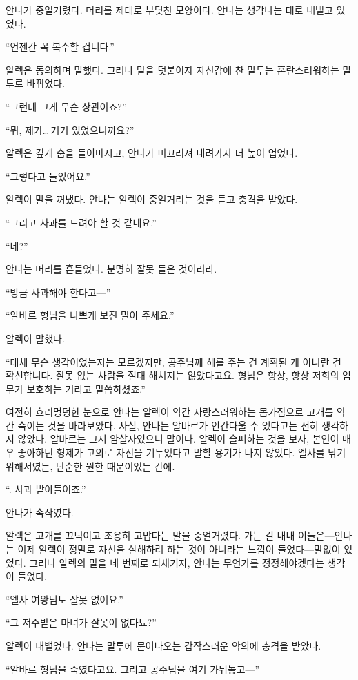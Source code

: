 안나가 중얼거렸다. 머리를 제대로 부딪친 모양이다. 안나는 생각나는 대로 내뱉고 있었다.

``언젠간 꼭 복수할 겁니다.''

알렉은 동의하며 말했다. 그러나 말을 덧붙이자 자신감에 찬 말투는 혼란스러워하는 말투로 바뀌었다.

``그런데 그게 무슨 상관이죠?''

``뭐, 제가\ldots\,거기 있었으니까요?''

알렉은 깊게 숨을 들이마시고, 안나가 미끄러져 내려가자 더 높이 업었다.

``그렇다고 들었어요.''

알렉이 말을 꺼냈다. 안나는 알렉이 중얼거리는 것을 듣고 충격을 받았다.

``그리고 사과를 드려야 할 것 같네요.''

``네?''

안나는 머리를 흔들었다. 분명히 잘못 들은 것이리라.

``방금 사과해야 한다고—''

``알바르 형님을 나쁘게 보진 말아 주세요.''

알렉이 말했다.

``대체 무슨 생각이었는지는 모르겠지만, 공주님께 해를 주는 건 계획된 게 아니란 건 확신합니다. 잘못 없는 사람을 절대 해치지는 않았다고요. 형님은 항상, 항상 저희의 임무가 보호하는 거라고 말씀하셨죠.''

여전히 흐리멍덩한 눈으로 안나는 알렉이 약간 자랑스러워하는 몸가짐으로 고개를 약간 숙이는 것을 바라보았다. 사실, 안나는 알바르가 인간다울 수 있다고는 전혀 생각하지 않았다. 알바르는 그저 암살자였으니 말이다. 알렉이 슬퍼하는 것을 보자, 본인이 매우 좋아하던 형제가 고의로 자신을 겨누었다고 말할 용기가 나지 않았다. 엘사를 낚기 위해서였든, 단순한 원한 때문이었든 간에.

``. 사과 받아들이죠.''

안나가 속삭였다.

알렉은 고개를 끄덕이고 조용히 고맙다는 말을 중얼거렸다. 가는 길 내내 이들은—안나는 이제 알렉이 정말로 자신을 살해하려 하는 것이 아니라는 느낌이 들었다—말없이 있었다. 그러나 알렉의 말을 네 번째로 되새기자, 안나는 무언가를 정정해야겠다는 생각이 들었다.

``엘사 여왕님도 잘못 없어요.''

``그 저주받은 마녀가 잘못이 없다뇨?''

알렉이 내뱉었다. 안나는 말투에 묻어나오는 갑작스러운 악의에 충격을 받았다.

``알바르 형님을 죽였다고요. 그리고 공주님을 여기 가둬놓고—''

